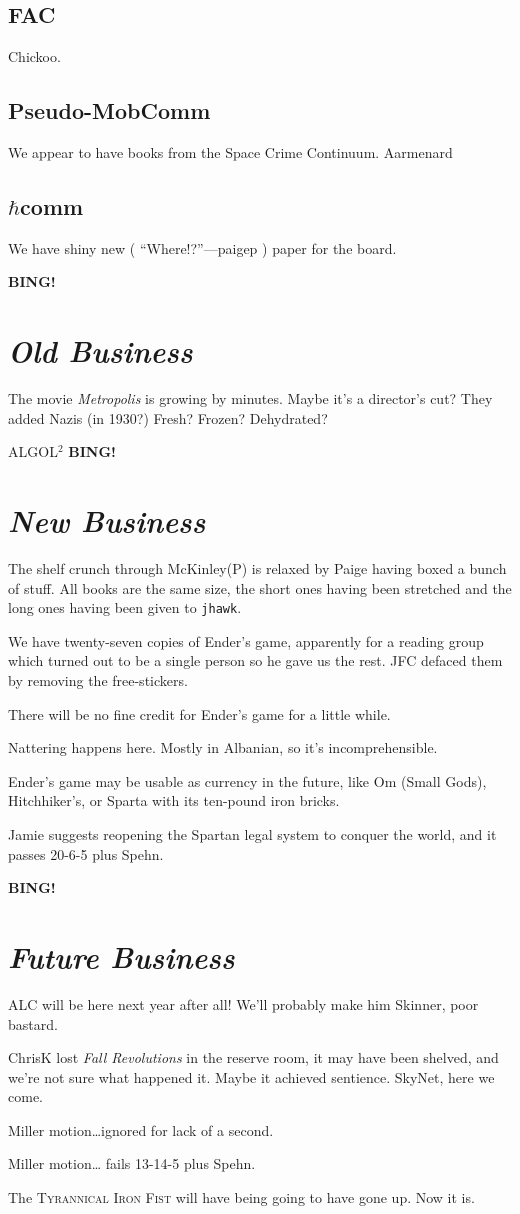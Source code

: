 \documentclass[10pt]{article}
\newcommand{\bing}{{\bf BING!} }
\newcommand{\goto}[1]{\bing \vskip 12pt \section*{{\em{#1}}}}
\newcommand{\ps}{ plus Spehn\xspace}
\begin{document}
\subsection*{FAC}
Chickoo.

\subsection*{Pseudo-MobComm}
We appear to have books from the Space Crime Continuum.
Aarmenard

\subsection*{$\hbar{}$comm}
We have shiny new ( ``Where!?''---paigep ) paper for the board.

\goto{Old Business}
The movie \emph{Metropolis} is growing by minutes.  Maybe it's a
director's cut?  They added Nazis (in 1930?)  Fresh?  Frozen?  Dehydrated?

ALGOL$^2$
\goto{New Business}
The shelf crunch through McKinley(P) is relaxed by Paige having boxed
a bunch of stuff.  All books are the same size, the short ones having
been stretched and the long ones having been given to \texttt{jhawk}.

We have twenty-seven copies of Ender's game, apparently for a reading
group which turned out to be a single person so he gave us the rest.
JFC defaced them by removing the free-stickers.

There will be no fine credit for Ender's game for a little while.

Nattering happens here.  Mostly in Albanian, so it's
incomprehensible.

Ender's game may be usable as currency in the future, like Om (Small
Gods), Hitchhiker's, or Sparta with its ten-pound iron bricks.

Jamie suggests reopening the Spartan legal system to conquer the
world, and it passes 20-6-5\ps.

\goto{Future Business}
ALC will be here next year after all!  We'll probably make him
Skinner, poor bastard.

ChrisK lost \emph{Fall Revolutions} in the reserve room, it may have
been shelved, and we're not sure what happened it.  Maybe it achieved
sentience.  SkyNet, here we come.

Miller motion\dots{}ignored for lack of a second.

Miller motion\dots{} fails 13-14-5\ps.

The \textsc{Tyrannical Iron Fist} will have being going to have gone
up.  Now it is.
\end{document}
